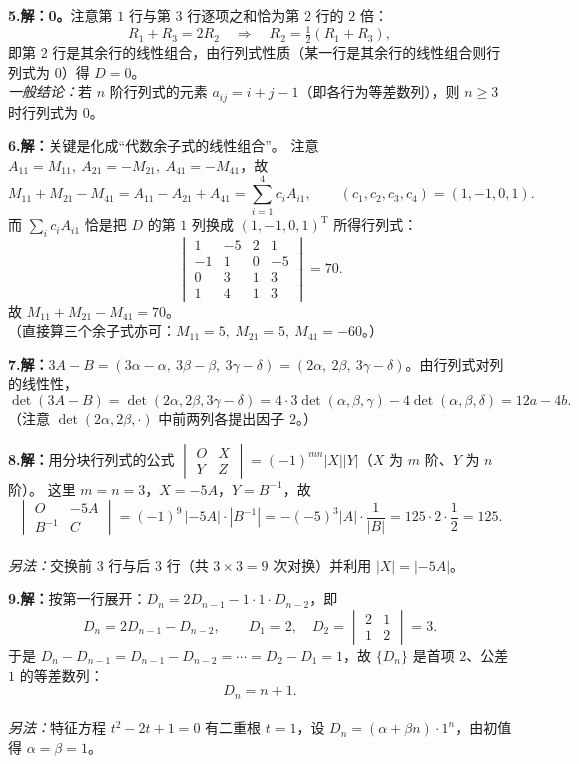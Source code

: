 ﻿\documentclass[11pt,a4paper,fontset=windows]{ctexart}
\newcommand{\sd}{\textbf{解：}}
\newcommand{\prob}[2]{\Needspace{5\baselineskip}\par\vspace{10pt}\noindent
  \textbf{#1}\hspace{0.4em}#2\par\vspace{3pt}}
\begin{document}
\prob{5.}{\sd \textbf{0。}注意第 $1$ 行与第 $3$ 行逐项之和恰为第 $2$ 行的 $2$ 倍：
\[
R_1+R_3=2R_2\quad\Longrightarrow\quad R_2=\tfrac12(R_1+R_3),
\]
即第 $2$ 行是其余行的线性组合，由行列式性质（某一行是其余行的线性组合则行列式为 $0$）得 $D=0$。
\\[2pt]
\emph{一般结论：}若 $n$ 阶行列式的元素 $a_{ij}=i+j-1$（即各行为等差数列），则 $n\ge3$ 时行列式为 $0$。}

\prob{6.}{\sd 关键是化成“代数余子式的线性组合”。
注意 $A_{11}=M_{11},\ A_{21}=-M_{21},\ A_{41}=-M_{41}$，故
\[
M_{11}+M_{21}-M_{41}=A_{11}-A_{21}+A_{41}
=\sum_{i=1}^{4}c_iA_{i1},\qquad (c_1,c_2,c_3,c_4)=(1,-1,0,1).
\]
而 $\sum_i c_iA_{i1}$ 恰是把 $D$ 的第 $1$ 列换成 $(1,-1,0,1)^{\mathrm T}$ 所得行列式：
\[
\begin{vmatrix}
1&-5&2&1\\
-1&1&0&-5\\
0&3&1&3\\
1&4&1&3
\end{vmatrix}
=70 .
\]
故 $M_{11}+M_{21}-M_{41}=70$。\\[2pt]
（直接算三个余子式亦可：$M_{11}=5,\ M_{21}=5,\ M_{41}=-60$。）}

\prob{7.}{\sd $3A-B=(3\alpha-\alpha,\ 3\beta-\beta,\ 3\gamma-\delta)=(2\alpha,\ 2\beta,\ 3\gamma-\delta)$。由行列式对列的线性性，
\[
\det(3A-B)=\det(2\alpha,2\beta,3\gamma-\delta)
=4\cdot 3\det(\alpha,\beta,\gamma)-4\det(\alpha,\beta,\delta)
=12a-4b .
\]
（注意 $\det(2\alpha,2\beta,\cdot)$ 中前两列各提出因子 $2$。）}

\prob{8.}{\sd 用分块行列式的公式
$\begin{vmatrix}O&X\\Y&Z\end{vmatrix}=(-1)^{mn}|X||Y|$（$X$ 为 $m$ 阶、$Y$ 为 $n$ 阶）。
这里 $m=n=3$，$X=-5A$，$Y=B^{-1}$，故
\[
\begin{vmatrix}O&-5A\\B^{-1}&C\end{vmatrix}
=(-1)^{9}\,|-5A|\cdot|B^{-1}|
=-(-5)^{3}|A|\cdot\frac1{|B|}
=125\cdot 2\cdot\frac12=125 .
\]
\\[2pt]
\emph{另法：}交换前 $3$ 行与后 $3$ 行（共 $3\times3=9$ 次对换）并利用 $|X|=|-5A|$。}

\prob{9.}{\sd 按第一行展开：$D_n=2D_{n-1}-1\cdot 1\cdot D_{n-2}$，即
\[
D_n=2D_{n-1}-D_{n-2},\qquad D_1=2,\quad D_2=\begin{vmatrix}2&1\\1&2\end{vmatrix}=3 .
\]
于是 $D_{n}-D_{n-1}=D_{n-1}-D_{n-2}=\cdots=D_2-D_1=1$，故 $\{D_n\}$ 是首项 $2$、公差 $1$ 的等差数列：
\[
D_n=n+1 .
\]
\\[2pt]
\emph{另法：}特征方程 $t^{2}-2t+1=0$ 有二重根 $t=1$，设 $D_n=(\alpha+\beta n)\cdot1^{n}$，由初值得 $\alpha=\beta=1$。}
\end{document}
